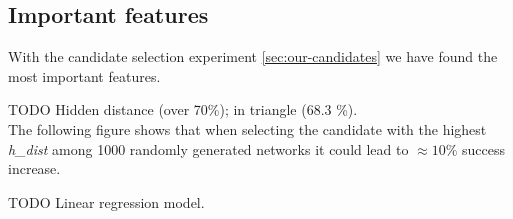 
\subsection{Important features}
\label{sec:results-candidates} 

With the candidate selection experiment \ref{sec:our-candidates} we have found the most important features. 

TODO Hidden distance (over 70\%); in triangle (68.3 \%). \\

The following figure shows that when selecting the candidate with the highest \emph{h\_dist} among 1000 randomly generated networks it could lead to $\approx 10\%$ success increase.


TODO Linear regression model. 
